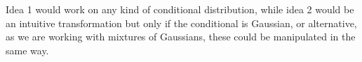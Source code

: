 Idea 1 would work on any kind of conditional distribution, while idea 2 would be an intuitive transformation
but only if the conditional is Gaussian, or alternative, as we are working with mixtures 
of Gaussians, these could be manipulated in the same way. 



